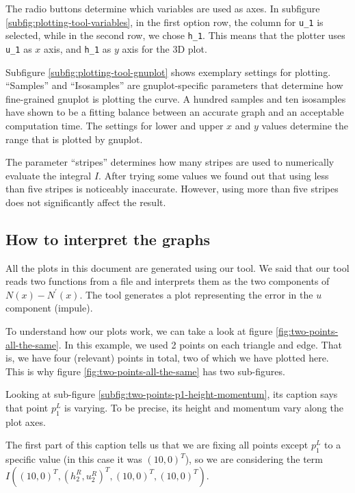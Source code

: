 \documentclass{article}
\begin{document}
The radio buttons determine which variables are used as axes. In subfigure \ref{subfig:plotting-tool-variables}, in the first option row, the column for \texttt{u\_1} is selected, while in the second row, we chose \texttt{h\_1}. This means that the plotter uses \texttt{u\_1} as $x$ axis, and \texttt{h\_1} as $y$ axis for the 3D plot.

Subfigure \ref{subfig:plotting-tool-gnuplot} shows exemplary settings for plotting. ``Samples'' and ``Isosamples'' are gnuplot-specific parameters that determine how fine-grained gnuplot is plotting the curve. A hundred samples and ten isosamples have shown to be a fitting balance between an accurate graph and an acceptable computation time. The settings for lower and upper $x$ and $y$ values determine the range that is plotted by gnuplot.

The parameter ``stripes'' determines how many stripes are used to numerically evaluate the integral $I$. After trying some values we found out that using less than five stripes is noticeably inaccurate. However, using more than five stripes does not significantly affect the result.

\subsection{How to interpret the graphs}
\label{sec:how-to-interpret-graphs}

All the plots in this document are generated using our tool. We said that our tool reads two functions from a file and interprets them as the two components of $N\left(x\right)-N^\prime\left(x\right)$. The tool generates a plot representing the error in the $u$ component (impule).

To understand how our plots work, we can take a look at figure \ref{fig:two-points-all-the-same}. In this example, we used 2 points on each triangle and edge. That is, we have four (relevant) points in total, two of which we have plotted here. This is why figure \ref{fig:two-points-all-the-same} has two sub-figures.

Looking at sub-figure \ref{subfig:two-points-p1-height-momentum}, its caption says that point $p_1^L$ is varying. To be precise, its height and momentum vary along the plot axes.

The first part of this caption tells us that we are fixing all points except $p_1^L$ to a specific value (in this case it was $\left(10, 0\right)^T$), so we are considering the term $I\left(\left(10, 0\right)^T, \left(h_2^R, u_2^R\right)^T, \left(10, 0\right)^T, \left(10, 0\right)^T\right)$.
\end{document}

